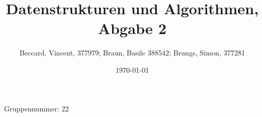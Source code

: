 \documentclass{article}
\title{Datenstrukturen und Algorithmen, Abgabe 2}
\author{Beccard, Vincent, 377979; Braun, Basile 388542; Brungs, Simon, 377281}
\date{\today}
\begin{document}
\noindent
Gruppennummer: 22%
\begingroup
\let\newpage\relax%
\maketitle
\endgroup
\renewcommand{\thesubsection}{\alph{subsection}}




\end{document}
